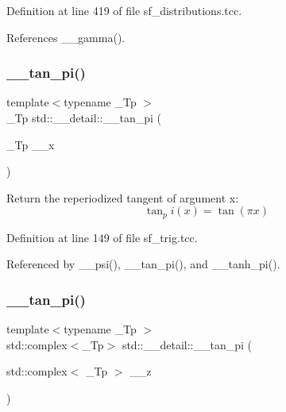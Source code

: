 Definition at line 419 of file sf\+\_\+distributions.\+tcc.



References \+\_\+\+\_\+gamma().

\mbox{\label{namespacestd_1_1____detail_a72fd3b7fcf9f49ade9411d782e8dbe4e}} 
\subsubsection{\texorpdfstring{\+\_\+\+\_\+tan\+\_\+pi()}{\_\_tan\_pi()}\hspace{0.1cm}{\footnotesize\ttfamily [1/2]}}
{\footnotesize\ttfamily template$<$typename \+\_\+\+Tp $>$ \\
\+\_\+\+Tp std\+::\+\_\+\+\_\+detail\+::\+\_\+\+\_\+tan\+\_\+pi (\begin{DoxyParamCaption}\item[{\+\_\+\+Tp}]{\+\_\+\+\_\+x }\end{DoxyParamCaption})}

Return the reperiodized tangent of argument x\+: \[ \tan_pi(x) = \tan(\pi x) \] 

Definition at line 149 of file sf\+\_\+trig.\+tcc.



Referenced by \+\_\+\+\_\+psi(), \+\_\+\+\_\+tan\+\_\+pi(), and \+\_\+\+\_\+tanh\+\_\+pi().

\mbox{\label{namespacestd_1_1____detail_ae19d579db4245c9c4e53a70a0513bb00}} 
\subsubsection{\texorpdfstring{\+\_\+\+\_\+tan\+\_\+pi()}{\_\_tan\_pi()}\hspace{0.1cm}{\footnotesize\ttfamily [2/2]}}
{\footnotesize\ttfamily template$<$typename \+\_\+\+Tp $>$ \\
std\+::complex$<$\+\_\+\+Tp$>$ std\+::\+\_\+\+\_\+detail\+::\+\_\+\+\_\+tan\+\_\+pi (\begin{DoxyParamCaption}\item[{std\+::complex$<$ \+\_\+\+Tp $>$}]{\+\_\+\+\_\+z }\end{DoxyParamCaption})}

